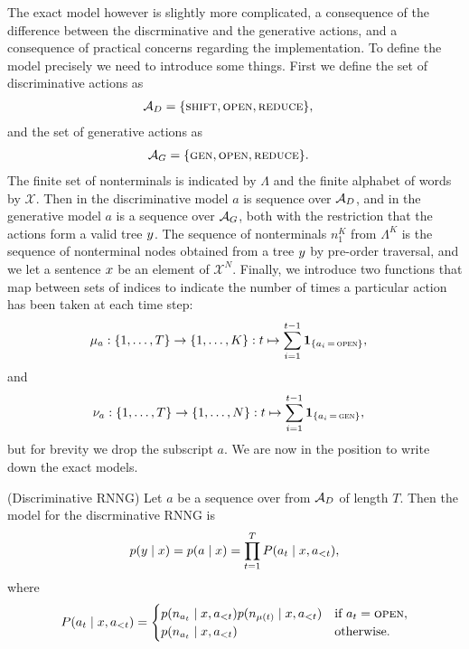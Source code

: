 The exact model however is slightly more complicated, a consequence of the difference between the discrminative and the generative actions, and a consequence of practical concerns regarding the implementation. To define the model precisely we need to introduce some things. First we define the set of discriminative actions as
\begin{align}
  \mathcal{A}_D &= \{ \textsc{shift}, \textsc{open}, \textsc{reduce} \},
\end{align}
and the set of generative actions as
\begin{align}
  \mathcal{A}_G &= \{ \textsc{gen}, \textsc{open}, \textsc{reduce} \}.
\end{align}
The finite set of nonterminals is indicated by $\Lambda$ and the finite alphabet of words by $\mathcal{X}$. Then in the discriminative model $a$ is sequence over $\mathcal{A}_D$, and in the generative model $a$ is a sequence over $\mathcal{A}_G$, both with the restriction that the actions form a valid tree $y$. The sequence of nonterminals $n_1^K$ from $\Lambda^K$ is the sequence of nonterminal nodes obtained from a tree $y$ by pre-order traversal, and we let a sentence $x$ be an element of $\mathcal{X}^N$. Finally, we introduce two functions that map between sets of indices to indicate the number of times a particular action has been taken at each time step:
\begin{align*}
  \mu_a &: \{ 1, \dots, T \} \to \{ 1, \dots, K \}: t \mapsto \sum_{i=1}^{t-1} \operatorname{\mathbf{1}}_{ \{ a_i \, = \, \textsc{open} \} },
\end{align*}
and
\begin{align*}
  \nu_a &: \{ 1, \dots, T \} \to \{ 1, \dots, N \}: t \mapsto \sum_{i=1}^{t-1} \operatorname{\mathbf{1}}_{ \{ a_i \, = \, \textsc{gen} \} },
\end{align*}
but for brevity we drop the subscript $a$. We are now in the position to write down the exact models.

\begin{definition}{(Discriminative RNNG)}
  Let $a$ be a sequence over from $\mathcal{A}_D$ of length $T$. Then the model for the discrminative RNNG is
  \begin{align}
    \label{eq:disc-model}
    p(y \mid x) = p(a \mid x) = \prod_{t=1}^T P( a_t \mid x, a_{<t}),
  \end{align}
  where
  \begin{equation}
    \label{eq:disc-model}
    P( a_t \mid x, a_{<t}) =
    \begin{cases}
      p( n_{ a_t } \mid x, a_{<t} ) p( n_{ \mu(t) } \mid x, a_{<t} ) & \text{if } a_t = \textsc{open},  \\
      p( n_{ a_t } \mid x, a_{<t} ) & \text{otherwise.}  \\
    \end{cases}
  \end{equation}
\end{definition}

